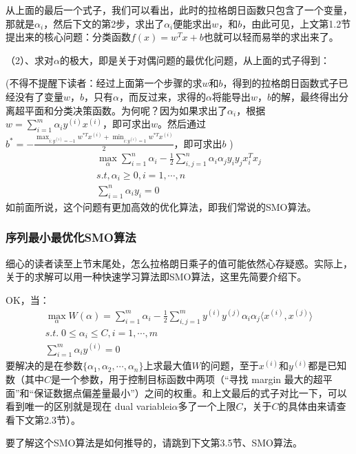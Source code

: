 \documentclass[a4paper,12pt]{article}
\begin{document}
  从上面的最后一个式子，我们可以看出，此时的拉格朗日函数只包含了一个变量，那就是$\alpha_i$，然后下文的第2步，求出了$\alpha_i$便能求出$w$，和$b$，由此可见，上文第1.2节提出来的核心问题：分类函数$f(x)=w^Tx+b$也就可以轻而易举的求出来了。

（2）、求对$\alpha$的极大，即是关于对偶问题的最优化问题，从上面的式子得到：

(不得不提醒下读者：经过上面第一个步骤的求$w$和$b$，得到的拉格朗日函数式子已经没有了变量$w$，$b$，只有$\alpha$，而反过来，求得的$\alpha$将能导出$w$，$b$的解，最终得出分离超平面和分类决策函数。为何呢？因为如果求出了$\alpha_i$，根据$w=\sum_{i=1}^m\alpha_iy^{(i)}x^{(i)}$，即可求出$w$。然后通过
$b^*=-\frac{\max_{i:y^{(i)}=-1}w^{*T}x^{(i)}+\min_{i:y^{(i)}=1}w^{*T}x^{(i)}}{2}$，即可求出$b$ )
\begin{equation}
  \begin{split}
    \max_\alpha\sum_{i=1}^n\alpha_i-\frac{1}{2}\sum_{i,j=1}^n\alpha_i\alpha_jy_iy_jx_i^Tx_j\\
    s.t,\alpha_i\geq0,i=1,\cdots,n\\
   \sum_{i=1}^n\alpha_iy_i=0
  \end{split}
\end{equation}
如前面所说，这个问题有更加高效的优化算法，即我们常说的SMO算法。
\subsubsection{序列最小最优化SMO算法}
细心的读者读至上节末尾处，怎么拉格朗日乘子的值可能依然心存疑惑。实际上，关于的求解可以用一种快速学习算法即SMO算法，这里先简要介绍下。

OK，当：
\begin{equation}
  \begin{split}
    \max_\alpha W(\alpha)=\sum_{i=1}^m\alpha_i-\frac{1}{2}\sum_{i,j=1}^my^{(i)}y^{(j)}\alpha_i\alpha_j\langle x^{(i)},x^{(j)}\rangle\\
    s.t.\; 0\leq\alpha_i\leq C,i=1,\cdots,m\\
    \sum_{i=1}^m\alpha_iy^{(i)}=0
  \end{split}
\end{equation}
要解决的是在参数$\{\alpha_1,\alpha_2,\cdots,\alpha_n\}$上求最大值$W$的问题，至于$x^{(i)}$和$y^{(i)}$都是已知数（其中$C$是一个参数，用于控制目标函数中两项（“寻找 margin 最大的超平面”和“保证数据点偏差量最小”）之间的权重。和上文最后的式子对比一下，可以看到唯一的区别就是现在 dual variablei$\alpha$多了一个上限$C$，关于$C$的具体由来请查看下文第2.3节）。

要了解这个SMO算法是如何推导的，请跳到下文第3.5节、SMO算法。
\end{document}
